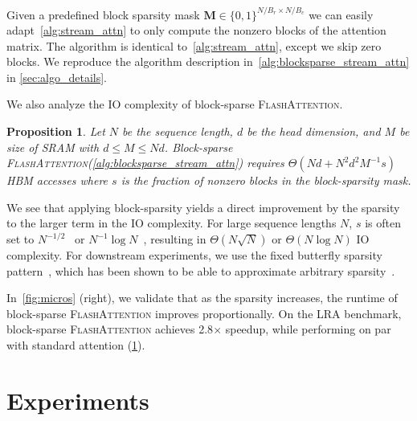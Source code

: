 \documentclass{article}
\newcommand{\vM}{\mathbf{M}}
\newcommand{\sysname}{\textsc{FlashAttention}\xspace}
\newtheorem{proposition}[theorem]{Proposition}
\begin{document}
Given a predefined block sparsity mask $\vM \in \{ 0, 1 \}^{N/B_r \times N/B_c}$ we can
easily adapt~\cref{alg:stream_attn} to only compute the nonzero blocks of the
attention matrix.
The algorithm is identical to~\cref{alg:stream_attn}, except we skip zero
blocks.
We reproduce the algorithm description in~\cref{alg:blocksparse_stream_attn} in
\cref{sec:algo_details}.

We also analyze the IO complexity of block-sparse \sysname.
\begin{proposition}\label{thm:io_complexity_blocksparse}
  Let $N$ be the sequence length, $d$ be the head dimension, and $M$ be size of
  SRAM with $d \leq M \leq Nd$.
  Block-sparse \sysname (\cref{alg:blocksparse_stream_attn}) requires
  $\Theta ( Nd + N^2 d^2 M^{-1} s )$ HBM accesses where $s$ is the
  fraction of nonzero blocks in the block-sparsity mask.
\end{proposition}
We see that applying block-sparsity yields a direct improvement by the sparsity to the larger term in the IO
complexity.
For large sequence lengths $N$, $s$ is often set to
$N^{-1/2}$~\citep{child2019generating} or
$N^{-1}\log N$~\citep{zaheer2020bigbird, beltagy2020longformer, dao2021pixelated}, resulting in $\Theta(N\sqrt{N})$ or
$\Theta(N \log N)$ IO complexity.
For downstream experiments, we use the fixed butterfly sparsity
pattern~\citep{dao2021pixelated}, which has been shown to be able to approximate
arbitrary sparsity~\citep{dao2020kaleidoscope}.

In~\cref{fig:micros} (right), we validate that as the sparsity increases, the
runtime of block-sparse \sysname improves proportionally.
On the LRA benchmark, block-sparse \sysname achieves 2.8$\times$
speedup, while performing on par with standard attention (\cref{sec:exp}).

\section{Experiments}
\label{sec:exp}
\end{document}
